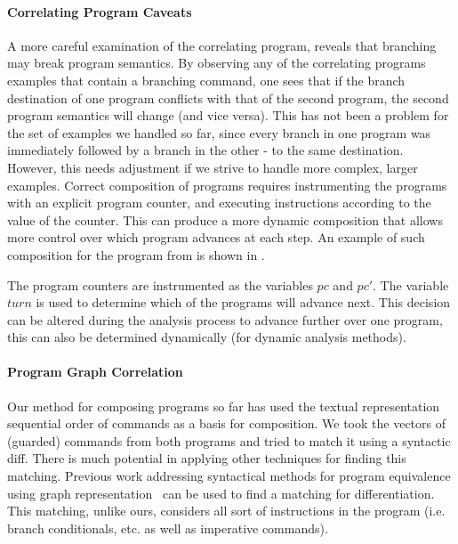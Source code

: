 \paragraph{Correlating Program Caveats}
A more careful examination of the correlating program, reveals that branching may break program semantics. By observing any of the correlating programs examples that contain a branching  command, one sees that if the branch destination of one program conflicts with that of the second program, the second program semantics will change (and vice versa). This has not been a problem for the set of examples we handled so far, since every branch in one program was immediately followed by a branch in the other - to the same destination. However, this needs adjustment if we strive to handle more complex, larger examples. Correct composition of programs requires instrumenting the programs with an explicit program counter, and executing instructions according to the value of the counter. This can produce a more dynamic composition that allows more control over which program advances at each step. An example of such composition for the program from  is shown in .



The program counters are instrumented as the variables $pc$ and $pc'$. The variable $turn$ is used to determine which of the programs will advance next. This decision can be altered during the analysis process to advance further over one program, this can also be determined dynamically (for dynamic analysis methods).

\paragraph{Program Graph Correlation}
Our method for composing programs so far has used the textual representation sequential order of commands as a basis for composition. We took the vectors of (guarded) commands from both programs and tried to match it using a syntactic diff. There is much potential in applying other techniques for finding this matching. Previous work addressing syntactical methods for program equivalence using graph representation~\cite{Horwitz89,Horwitz90} can be used to find a matching for differentiation. This matching, unlike ours, considers all sort of instructions in the program (i.e. branch conditionals, etc. as well as imperative commands).

